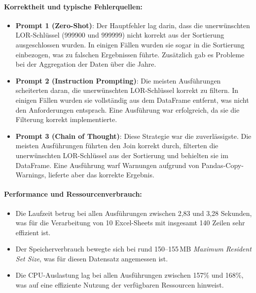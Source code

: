 \documentclass[11pt,a4paper]{article}
\begin{document}
\paragraph{Korrektheit und typische Fehlerquellen:}
\begin{itemize}
    \item \textbf{Prompt 1 (Zero-Shot)}: Der Hauptfehler lag darin, dass die unerwünschten LOR-Schlüssel (999900 und 999999) nicht korrekt aus der Sortierung ausgeschlossen wurden. In einigen Fällen wurden sie sogar in die Sortierung einbezogen, was zu falschen Ergebnissen führte. Zusätzlich gab es Probleme bei der Aggregation der Daten über die Jahre.
    \item \textbf{Prompt 2 (Instruction Prompting)}: Die meisten Ausführungen scheiterten daran, die unerwünschten LOR-Schlüssel korrekt zu filtern. In einigen Fällen wurden sie vollständig aus dem DataFrame entfernt, was nicht den Anforderungen entsprach. Eine Ausführung war erfolgreich, da sie die Filterung korrekt implementierte.
    \item \textbf{Prompt 3 (Chain of Thought)}: Diese Strategie war die zuverlässigste. Die meisten Ausführungen führten den Join korrekt durch, filterten die unerwünschten LOR-Schlüssel aus der Sortierung und behielten sie im DataFrame. Eine Ausführung warf Warnungen aufgrund von Pandas-Copy-Warnings, lieferte aber das korrekte Ergebnis.
\end{itemize}

\paragraph{Performance und Ressourcenverbrauch:}
\begin{itemize}
    \item Die Laufzeit betrug bei allen Ausführungen zwischen 2,83 und 3,28 Sekunden, was für die Verarbeitung von 10 Excel-Sheets mit insgesamt 140 Zeilen sehr effizient ist.
    \item Der Speicherverbrauch bewegte sich bei rund 150--155\,MB \emph{Maximum Resident Set Size}, was für diesen Datensatz angemessen ist.
    \item Die CPU-Auslastung lag bei allen Ausführungen zwischen 157\% und 168\%, was auf eine effiziente Nutzung der verfügbaren Ressourcen hinweist.
\end{itemize}
\end{document}
